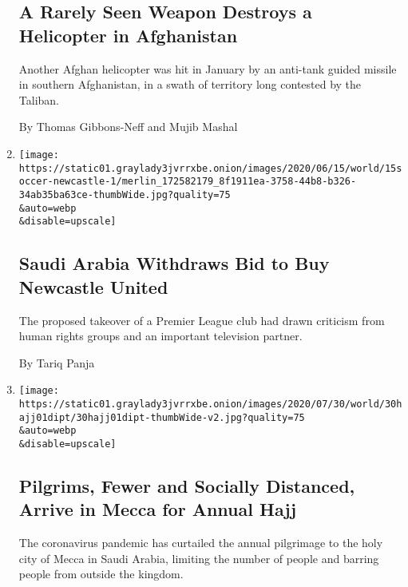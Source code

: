 \begin{enumerate}
{  \subsection{A Rarely Seen Weapon Destroys a Helicopter in
  Afghanistan}\label{a-rarely-seen-weapon-destroys-a-helicopter-in-afghanistan}}

  Another Afghan helicopter was hit in January by an anti-tank guided
  missile in southern Afghanistan, in a swath of territory long
  contested by the Taliban.

  By Thomas Gibbons-Neff and Mujib Mashal
\item
  \href{/2020/07/30/sports/soccer/saudi-arabia-newcastle-united.html}{}

  \texttt{[image: https://static01.graylady3jvrrxbe.onion/images/2020/06/15/world/15soccer-newcastle-1/merlin\_172582179\_8f1911ea-3758-44b8-b326-34ab35ba63ce-thumbWide.jpg?quality=75\\\&auto=webp\\\&disable=upscale]}

  \hypertarget{saudi-arabia-withdraws-bid-to-buy-newcastle-united}{%
  \subsection{Saudi Arabia Withdraws Bid to Buy Newcastle
  United}\label{saudi-arabia-withdraws-bid-to-buy-newcastle-united}}

  The proposed takeover of a Premier League club had drawn criticism
  from human rights groups and an important television partner.

  By Tariq Panja
\item
  \href{/2020/07/30/world/middleeast/pilgrims-hajj-mecca-coronavirus-pandemic.html}{}

  \texttt{[image: https://static01.graylady3jvrrxbe.onion/images/2020/07/30/world/30hajj01dipt/30hajj01dipt-thumbWide-v2.jpg?quality=75\\\&auto=webp\\\&disable=upscale]}

  \hypertarget{pilgrims-fewer-and-socially-distanced-arrive-in-mecca-for-annual-hajj}{%
  \subsection{Pilgrims, Fewer and Socially Distanced, Arrive in Mecca
  for Annual
  Hajj}\label{pilgrims-fewer-and-socially-distanced-arrive-in-mecca-for-annual-hajj}}

  The coronavirus pandemic has curtailed the annual pilgrimage to the
  holy city of Mecca in Saudi Arabia, limiting the number of people and
  barring people from outside the kingdom.


\end{enumerate}
